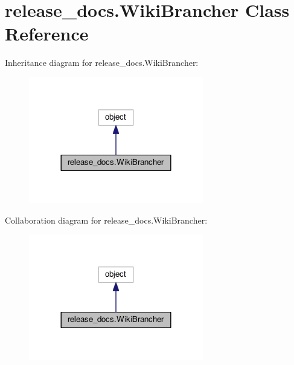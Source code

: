 \hypertarget{classrelease__docs_1_1WikiBrancher}{}\section{release\+\_\+docs.\+Wiki\+Brancher Class Reference}
\label{classrelease__docs_1_1WikiBrancher}


Inheritance diagram for release\+\_\+docs.\+Wiki\+Brancher\+:\nopagebreak
\begin{figure}[H]
\begin{center}
\leavevmode
\includegraphics[width=216pt]{classrelease__docs_1_1WikiBrancher__inherit__graph}
\end{center}
\end{figure}


Collaboration diagram for release\+\_\+docs.\+Wiki\+Brancher\+:\nopagebreak
\begin{figure}[H]
\begin{center}
\leavevmode
\includegraphics[width=216pt]{classrelease__docs_1_1WikiBrancher__coll__graph}
\end{center}
\end{figure}
